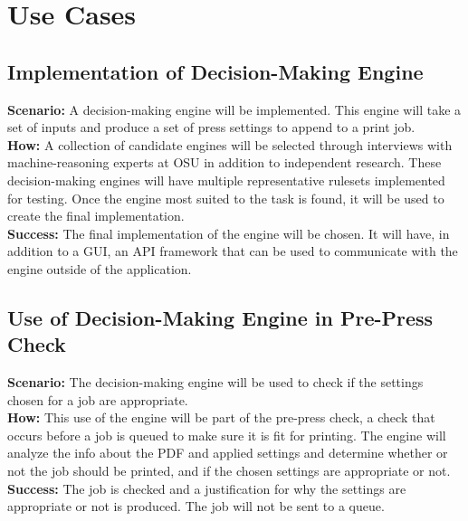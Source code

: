 \documentclass[onecolumn, draftclsnofoot,10pt, compsoc]{IEEEtran}
\begin{document}
\section{Use Cases}
\subsection{Implementation of Decision-Making Engine}
\textbf{Scenario:} A decision-making engine will be implemented. This engine will take a set of inputs and produce a set of press settings to append to a print job.\\
\textbf{How:} A collection of candidate engines will be selected through interviews with machine-reasoning experts at OSU in addition to independent research. These decision-making engines will have multiple representative rulesets implemented for testing. Once the engine most suited to the task is found, it will be used to create the final implementation.\\
\textbf{Success:} The final implementation of the engine will be chosen. It will have, in addition to a GUI, an API framework that can be used to communicate with the engine outside of the application. 

\subsection{Use of Decision-Making Engine in Pre-Press Check}
\textbf{Scenario:} The decision-making engine will be used to check if the settings chosen for a job are appropriate.\\
\textbf{How:} This use of the engine will be part of the pre-press check, a check that occurs before a job is queued to make sure it is fit for printing. The engine will analyze the info about the PDF and applied settings and determine whether or not the job should be printed, and if the chosen settings are appropriate or not.\\
\textbf{Success:} The job is checked and a justification for why the settings are appropriate or not is produced. The job will not be sent to a queue.
\end{document}
